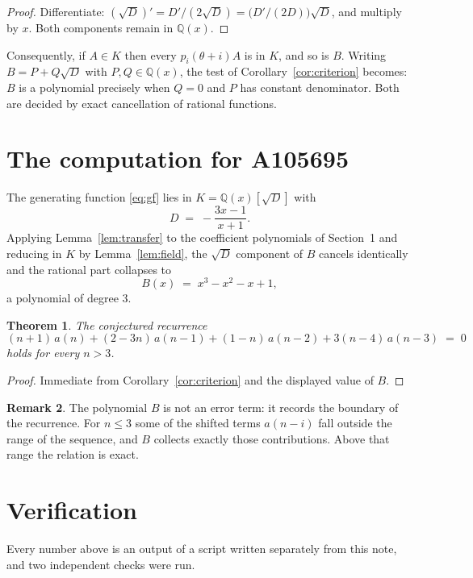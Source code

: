 \documentclass[11pt,a4paper]{article}
\theoremstyle{plain}
\newtheorem{theorem}{Theorem}
\theoremstyle{definition}
\newtheorem{remark}[theorem]{Remark}
\begin{document}
\begin{proof}
Differentiate: $(\sqrt{D})'=D'/(2\sqrt{D})=\bigl(D'/(2D)\bigr)\sqrt{D}$, and multiply by
$x$. Both components remain in $\mathbb{Q}(x)$.
\end{proof}

Consequently, if $A\in K$ then every $p_{i}(\theta+i)A$ is in $K$, and so is $B$. Writing
$B=P+Q\sqrt{D}$ with $P,Q\in\mathbb{Q}(x)$, the test of Corollary~\ref{cor:criterion}
becomes: $B$ is a polynomial precisely when $Q=0$ and $P$ has constant denominator. Both
are decided by exact cancellation of rational functions.

\section{The computation for A105695}

The generating function \eqref{eq:gf} lies in $K=\mathbb{Q}(x)[\sqrt{D}]$ with
\[
D \;=\; - \frac{3 x - 1}{x + 1} .
\]
Applying Lemma~\ref{lem:transfer} to the coefficient polynomials of Section~1 and reducing
in $K$ by Lemma~\ref{lem:field}, the $\sqrt{D}$ component of $B$ cancels identically and
the rational part collapses to
\[
B(x)\;=\;x^{3} - x^{2} - x + 1 ,
\]
a polynomial of degree $3$.

\begin{theorem}
The conjectured recurrence
\[
(n + 1)\,a(n) + (2 - 3 n)\,a(n-1) + (1 - n)\,a(n-2) + 3 \left(n - 4\right)\,a(n-3) \;=\;0
\]
holds for every $n>3$.
\end{theorem}

\begin{proof}
Immediate from Corollary~\ref{cor:criterion} and the displayed value of $B$.
\end{proof}

\begin{remark}
The polynomial $B$ is not an error term: it records the boundary of the recurrence. For
$n\le3$ some of the shifted terms $a(n-i)$ fall outside the range of the sequence,
and $B$ collects exactly those contributions. Above that range the relation is exact.
\end{remark}

\section{Verification}

Every number above is an output of a script written separately from this note, and two
independent checks were run.
\end{document}
